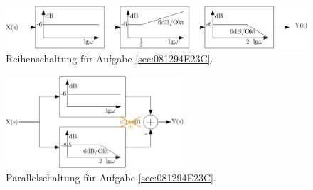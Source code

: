 \begin{figure}[h]
\centering
\includegraphics[width=1\textwidth]{../system_properties_ct/cascade_081294E23C.png}
\caption{Reihenschaltung für Aufgabe \ref{sec:081294E23C}.}
\label{fig:cascade_081294E23C}
\end{figure}


\begin{figure}[h]
\centering
\includegraphics[width=0.59\textwidth]{../system_properties_ct/parallel_081294E23C.png}
\caption{Parallelschaltung für Aufgabe \ref{sec:081294E23C}.}
\label{fig:parallel_081294E23C}
\end{figure}






